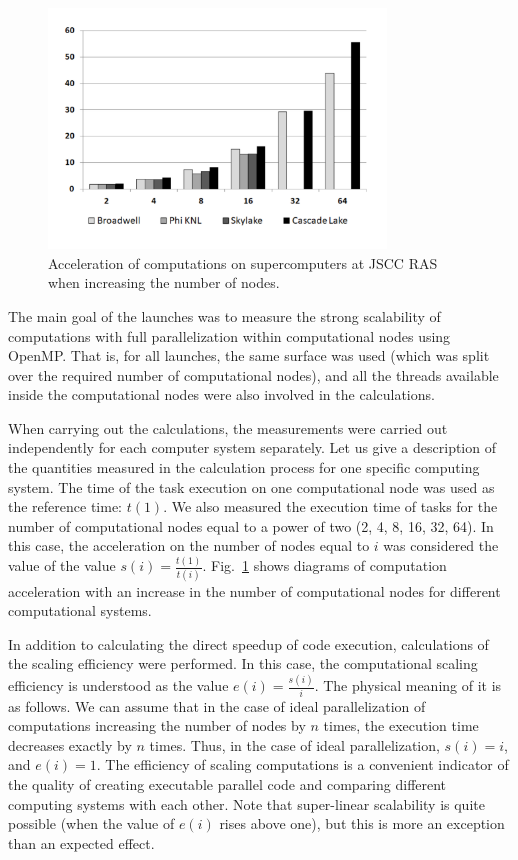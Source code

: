 \documentclass[
11pt,%
tightenlines,%
twoside,%
onecolumn,%
nofloats,%
nobibnotes,%
nofootinbib,%
superscriptaddress,%
noshowpacs,%
centertags]%
{revtex4}
\begin{document}
\begin{figure}[h]
\includegraphics[width=0.8\textwidth]{pics/speedup.pdf}
\caption{Acceleration of computations on supercomputers at JSCC RAS when increasing the number of nodes.}\label{fig:speedup}
\end{figure}

The main goal of the launches was to measure the strong scalability of computations with full parallelization within computational nodes using OpenMP.
That is, for all launches, the same surface was used (which was split over the required number of computational nodes), and all the threads available inside the computational nodes were also involved in the calculations.

When carrying out the calculations, the measurements were carried out independently for each computer system separately.
Let us give a description of the quantities measured in the calculation process for one specific computing system.
The time of the task execution on one computational node was used as the reference time: $ t(1) $.
We also measured the execution time of tasks for the number of computational nodes equal to a power of two (2, 4, 8, 16, 32, 64).
In this case, the acceleration on the number of nodes equal to $ i $ was considered the value of the value $ s(i) = \frac{t(1)}{t(i)} $.
Fig.~\ref{fig:speedup} shows diagrams of computation acceleration with an increase in the number of computational nodes for different computational systems.

In addition to calculating the direct speedup of code execution, calculations of the scaling efficiency were performed.
In this case, the computational scaling efficiency is understood as the value $ e(i) = \frac{s(i)}{i} $.
The physical meaning of it is as follows.
We can assume that in the case of ideal parallelization of computations increasing the number of nodes by $ n $ times, the execution time decreases exactly by $ n $ times.
Thus, in the case of ideal parallelization, $ s (i) = i $, and $ e(i) = 1 $.
The efficiency of scaling computations is a convenient indicator of the quality of creating executable parallel code and comparing different computing systems with each other.
Note that super-linear scalability is quite possible (when the value of $ e(i) $ rises above one), but this is more an exception than an expected effect.
\end{document}
